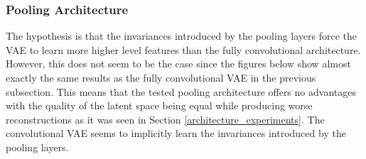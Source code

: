 \subsubsection{Pooling Architecture}

The hypothesis is that the invariances introduced by the pooling layers force the VAE to learn more higher level
features than the fully convolutional architecture. However, this does not seem to be the case since the 
figures below show almost exactly the same results as the fully convolutional
VAE in the previous subsection. This means that the tested pooling architecture offers no advantages with the
quality of the latent space being equal while producing worse reconstructions as it was seen in Section 
\ref{architecture_experiments}. The convolutional VAE seems to implicitly learn the invariances introduced by
the pooling layers.

